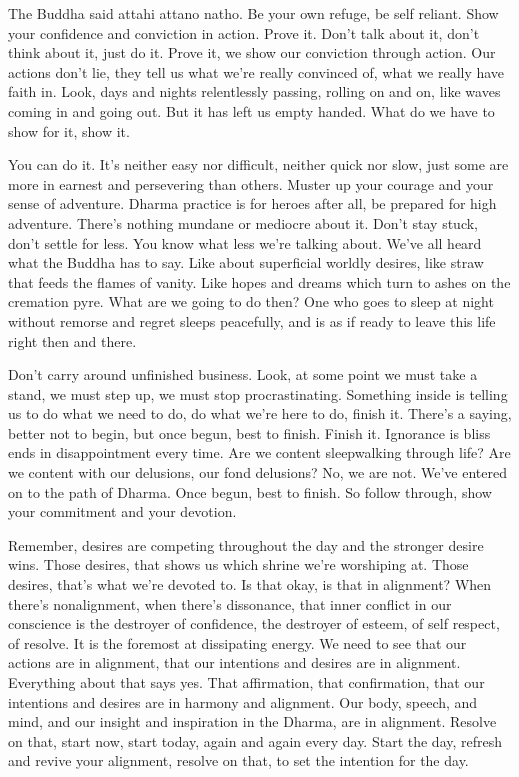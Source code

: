\documentclass[12pt,openany]{book}
\begin{document}
The Buddha said attahi attano natho. Be your own refuge, be self reliant. Show your confidence and conviction in action. Prove it. Don't talk about it, don't think about it, just do it. Prove it, we show our conviction through action. Our actions don't lie, they tell us what we’re really convinced of, what we really have faith in. Look, days and nights relentlessly passing, rolling on and on, like waves coming in and going out. But it has left us empty handed. What do we have to show for it, show it.

You can do it. It’s neither easy nor difficult, neither quick nor slow, just some are more in earnest and persevering than others. Muster up your courage and your sense of adventure. Dhar\-ma practice is for heroes after all, be prepared for high adventure. There’s nothing mundane or mediocre about it. Don't stay stuck, don't settle for less. You know what less we're talking about. We've all heard what the Buddha has to say. Like about superficial world\-ly desires, like straw that feeds the flames of vanity. Like hopes and dreams which turn to ashes on the cremation pyre. What are we going to do then? One who goes to sleep at night without remorse and regret sleeps peacefully, and is as if ready to leave this life right then and there.

Don't carry around unfinished business. Look, at some point we must take a stand, we must step up, we must stop procrastinating. Something inside is telling us to do what we need to do, do what we're here to do, finish it. There's a saying, better not to begin, but once begun, best to finish. Finish it. Ignorance is bliss ends in disappointment every time. Are we content sleepwalking through life? Are we content with our delusions, our fond delusions? No, we are not. We’ve entered on to the path of Dhar\-ma. Once begun, best to finish. So follow through, show your commitment and your devotion.

Remember, desires are competing throughout the day and the stronger desire wins. Those desires, that shows us which shrine we're worshiping at. Those desires, that's what we're devoted to. Is that okay, is that in alignment? When there's nonalignment, when there’s dissonance, that inner conflict in our conscience is the destroyer of confidence, the destroyer of esteem, of self respect, of resolve. It is the foremost at dissipating energy. We need to see that our actions are in alignment, that our intentions and desires are in alignment. Everything about that says yes. That affirmation, that confirmation, that our intentions and desires are in harmony and alignment. Our body, speech, and mind, and our insight and inspiration in the Dhar\-ma, are in alignment. Resolve on that, start now, start today, again and again every day. Start the day, refresh and revive your alignment, resolve on that, to set the intention for the day.
\end{document}
